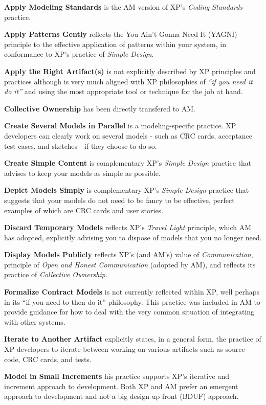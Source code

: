 {\bf Apply Modeling Standards} is the AM version of XP's \emph{Coding Standards}
practice.

{\bf Apply Patterns Gently} reflects the You Ain't Gonna Need It (YAGNI)
principle to the effective application of patterns within your system, in
conformance to XP's practice of \emph{Simple Design}.

{\bf Apply the Right Artifact(s)} is not explicitly described by XP principles
and practices although is very much aligned with XP philosophies of
\emph{\enquote{if you need it do it}} and using the most appropriate tool or
technique for the job at hand.

{\bf Collective Ownership} has been directly transfered to AM.

{\bf Create Several Models in Parallel} is a modeling-specific practice. XP
developers can clearly work on several models - such as CRC cards, acceptance
test cases, and sketches - if they choose to do so.

{\bf Create Simple Content} is complementary XP's \emph{Simple Design} practice
that advises to keep your models as simple as possible.

{\bf Depict Models Simply} is complementary XP's \emph{Simple Design} practice
that suggests that your models do not need to be fancy to be effective, perfect
examples of which are CRC cards and user stories.

{\bf Discard Temporary Models} reflects XP's \emph{Travel Light} principle,
which AM has adopted, explicitly advising you to dispose of models that you no
longer need.

{\bf Display Models Publicly} reflects XP's (and AM's) value of
\emph{Communication}, principle of \emph{Open and Honest Communication} (adopted
by AM), and reflects its practice of \emph{Collective Ownership}.

{\bf Formalize Contract Models} is not currently reflected within
XP, well perhaps in its \enquote{if you need to then do it} philosophy. This
practice was included in AM to provide guidance for how to deal with the very
common situation of integrating with other systems.

{\bf Iterate to Another Artifact} explicitly states, in a general form, the
practice of XP developers to iterate between working on various artifacts such
as source code, CRC cards, and tests.

{\bf Model in Small Increments} his practice supports XP's iterative and
increment approach to development. Both XP and AM prefer an emergent approach
to development and not a big design up front (BDUF) approach.

